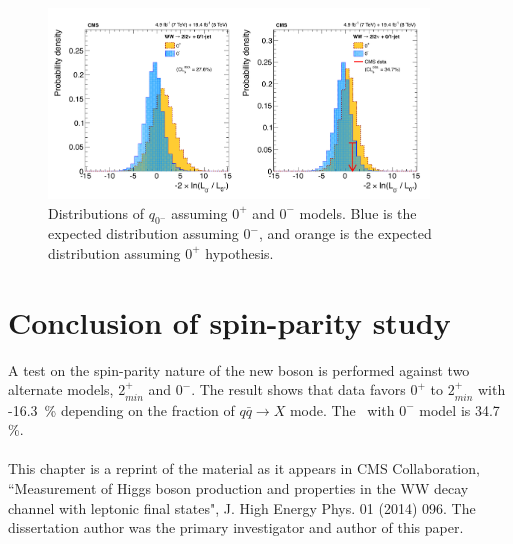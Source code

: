 %
\begin{figure}[ht!] 
\centering 
\includegraphics[width=0.9\textwidth]{figures/spin0mLLR.pdf}
\caption{Distributions of $q_{0^-}$ assuming $0^+$ and $0^-$ models.  
Blue is the expected distribution assuming $0^-$, 
and orange is the expected distribution assuming $0^+$ hypothesis.}
\label{fig:llr_spin0m} 
\end{figure} 

\section{Conclusion of spin-parity study} 

A test on the spin-parity nature of the new boson is performed against two alternate 
models, $2_{min}^+$ and $0^-$. The result shows that data favors $0^+$ to 
$2_{min}^+$ with -16.3~\% depending on the fraction of 
$q\bar{q}\rightarrow X$ mode. The \CLs\ with $0^-$ model is 34.7 \%.  
\\
\\

 This chapter is a reprint of the material as it appears in CMS Collaboration, 
 ``Measurement of Higgs boson production and properties in the WW decay channel with 
 leptonic final states", J. High Energy Phys. 01 (2014) 096. 
The dissertation author was the primary investigator and author of this paper. 
